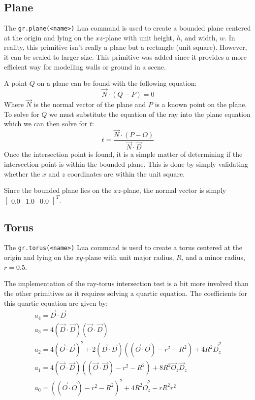 \subsection*{Plane}
The \verb|gr.plane(<name>)| Lua command is used to create a bounded plane 
centered at the origin and lying on the $xz$-plane with unit height, $h$, and 
width, $w$. In reality, this primitive isn't really a plane but a rectangle
(unit square). However, it can be scaled to larger size. This primitive was
added since it provides a more efficient way for modelling walls or ground in a
scene.

A point $Q$ on a plane can be found with the following equation:
\begin{equation}
  \vec{N}\cdot (Q - P) = 0
\end{equation}
Where $\vec{N}$ is the normal vector of the plane and $P$ is a known point on
the plane. To solve for $Q$ we must substitute the equation of the ray into the
plane equation which we can then solve for $t$:
\begin{equation}
  t = \frac{\vec{N}\cdot (P - O)}{\vec{N}\cdot \vec{D}}
\end{equation}
Once the intersection point is found, it is a simple matter of determining if
the intersection point is within the bounded plane. This is done by simply
validating whether the $x$ and $z$ coordinates are within the unit square.

Since the bounded plane lies on the $xz$-plane, the normal vector is simply
$\begin{bmatrix} 0.0 & 1.0 & 0.0
\end{bmatrix}^{T}$.

\subsection*{Torus}
The \verb|gr.torus(<name>)| Lua command is used to create a torus centered at
the origin and lying on the $xy$-plane with unit major radius, $R$, and a minor 
radius, $r = 0.5$.

The implementation of the ray-torus intersection test is a bit more involved
than the other primitives as it requires solving a quartic equation. The
coefficients for this quartic equation are given by:
\begin{equation}
\begin{split}
  a_{4} = \vec{D}\cdot\vec{D} \\
  a_{3} = 4(\vec{D}\cdot\vec{D})(\vec{O}\cdot\vec{D}) \\
  a_{2} = 4(\vec{O}\cdot\vec{D})^2 + 2(\vec{D}\cdot\vec{D})((\vec{O}\cdot
  \vec{O}) - r^2 - R^2) + 4R^2\vec{D}_{z}^2 \\
  a_{1} = 4(\vec{O}\cdot\vec{D})((\vec{O}\cdot\vec{D}) - r^2 - R^2) +8R^2
  \vec{O}_{z}\vec{D}_{z} \\
  a_{0} = ((\vec{O}\cdot\vec{O}) - r^2 - R^2)^2 + 4R^2\vec{O}_{z}^2 - rR^2r^2
\end{split}
\end{equation}

